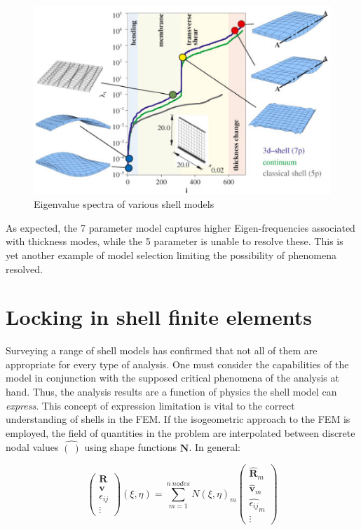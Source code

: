 \begin{figure}[H]
	\centering
	\def\svgwidth{\columnwidth}
	\includegraphics[width=12cm]{images/eigenvaluespectra.png}
	\caption{Eigenvalue spectra of various shell models \cite{RammLitBook04}}
	\label{shelleigenvaluespectra}
\end{figure}

As expected, the 7 parameter model captures higher Eigen-frequencies associated with thickness modes, while the 5 parameter is unable to resolve these. This is yet another example of model selection limiting the possibility of phenomena resolved.

\section{Locking in shell finite elements}
\label{locking in shell finite elements}

Surveying a range of shell models has confirmed that not all of them are appropriate for every type of analysis. One must consider the capabilities of the model in conjunction with the supposed critical phenomena of the analysis at hand. Thus, the analysis results are a function of physics the shell model can \textit{express}. This concept of expression limitation is vital to the correct understanding of shells in the FEM. If the isogeometric approach to the FEM is employed, the field of quantities in the problem are interpolated between discrete nodal values $\hat{(\ )}$ using shape functions $\mathbf{N}$. In general:

\begin{equation} 
\begin{pmatrix}
\mathbf{R} \\
\mathbf{v} \\
\epsilon_{ij} \\
\vdots
\end{pmatrix}
(\xi,\eta)
=
\sum_{m=1}^{n\ nodes}
N(\xi,\eta)_m
{\begin{pmatrix}
	\hat{\mathbf{R}}_m \\
	\hat{\mathbf{v}}_m \\
	\hat{\epsilon_{ij}}_m \\
	\vdots
	\end{pmatrix}}
\label{eqfemtech1}
\end{equation}

